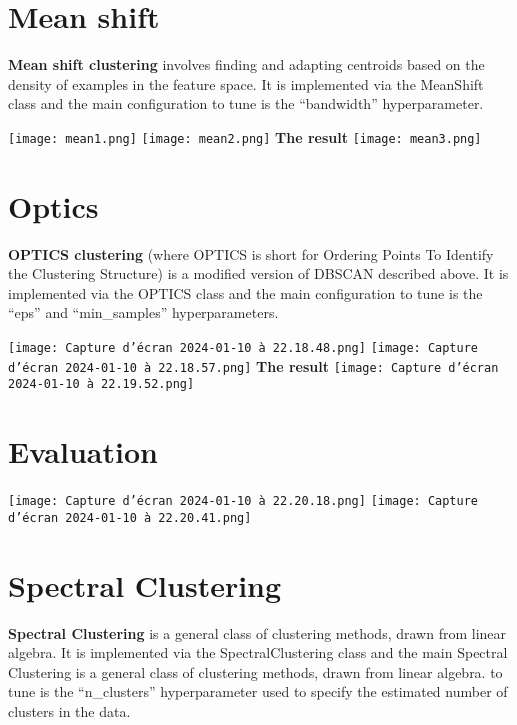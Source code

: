 \documentclass[12pt,a4paper]{report}
\begin{document}
\section{Mean shift}
\textbf{Mean shift clustering}  involves finding and adapting centroids based on the density of examples in the feature space. It is implemented via the MeanShift class and the main configuration to tune is the “bandwidth” hyperparameter.\\

\begin{center}
    \texttt{[image: mean1.png]}
     \texttt{[image: mean2.png]}
   \textbf{The result}
   \texttt{[image: mean3.png]}
\end{center} 



\section{Optics}
\textbf{OPTICS clustering}  (where OPTICS is short for Ordering Points To Identify the Clustering Structure) is a modified version of DBSCAN described above. It is implemented via the OPTICS class and the main configuration to tune is the “eps” and “min\_samples” hyperparameters.\\

\begin{center}
    \texttt{[image: Capture d’écran 2024-01-10 à 22.18.48.png]}
     \texttt{[image: Capture d’écran 2024-01-10 à 22.18.57.png]}
   \textbf{The result}
   \texttt{[image: Capture d’écran 2024-01-10 à 22.19.52.png]}
\end{center} 

\section{Evaluation}
\begin{center}
    \texttt{[image: Capture d’écran 2024-01-10 à 22.20.18.png]}
    \texttt{[image: Capture d’écran 2024-01-10 à 22.20.41.png]}
  
   
\end{center} 

\section{Spectral Clustering}
\textbf{Spectral Clustering} is a general class of clustering methods, drawn from linear algebra. It is implemented via the SpectralClustering class and the main Spectral Clustering is a general class of clustering methods, drawn from linear algebra. to tune is the “n\_clusters” hyperparameter used to specify the estimated number of clusters in the data.\\
\end{document}

